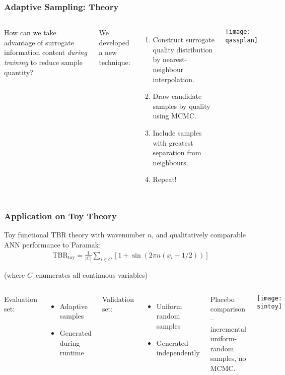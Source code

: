 \begin{frame}
	\frametitle{Adaptive Sampling: Theory}
	 \begin{columns}[onlytextwidth,T]
      \column{\dimexpr\linewidth-6cm-5mm}
        
        How can we take advantage of surrogate information content \textit{during training} to reduce sample quantity? \newline
        
		We developed \alert{a new technique:}
        \vspace{-5pt}
        \begin{enumerate}
        \item Construct surrogate quality distribution by nearest- neighbour interpolation.
        \item Draw candidate samples by quality using MCMC.
        \item Include samples with greatest separation from neighbours.
        \item Repeat!
        \end{enumerate}
      \column{6cm}
      \texttt{[image: qassplan]}

    \end{columns}
\end{frame}

\begin{frame}
	\frametitle{Application on Toy Theory}
	Toy functional TBR theory with wavenumber $n$, and qualitatively comparable ANN performance to Paramak:
	\begin{align*}
		\text{TBR}_\text{toy} = \frac{1}{|C|}\sum_{i \in C} \left[1 + \sin(2\pi n (x_i - 1/2)) \right]
	\end{align*}

	\vspace{-1em}
	{\footnotesize
		\hfill(where $C$~enumerates all continuous variables)
	}

	\vspace{1em}

	\begin{columns}[T]
		\column{0.5\paperwidth}
		\vspace{0.5em}
		Evaluation set:
		\begin{itemize}
		    \item Adaptive samples
		    \item Generated during runtime
		\end{itemize}
		\vspace{0.5em}
		Validation set:
		\begin{itemize}
		    \item Uniform random samples
		    \item Generated independently
		\end{itemize}
		\vspace{15pt}

		Placebo comparison -- incremental uniform-random samples, no MCMC.


		\column{0.4\paperwidth}
		\hspace{-20pt}\texttt{[image: sintoy]}

	\end{columns}
\end{frame}

